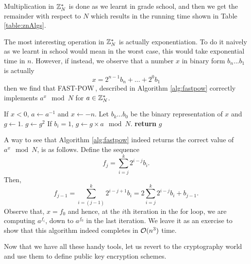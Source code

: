 

Multiplication in ${{\mathbb Z}}_N^*$ is done as we learnt in grade school, and then we get the remainder with respect to $N$ which results in the running time shown in Table \ref{table:znAlgs}. 

\newcommand{\fpow}{\textnormal{FAST-POW}\,}

The most interesting operation in ${{\mathbb Z}}_N^*$ is actually exponentiation. To do it naively as we learnt in school would mean in the worst case, this would take exponential time in $n$.  However, if instead, we observe that a number $x$ in binary form $b_n...b_1$ is actually 
\[
x = 2^{n-1}b_n + ...  + 2^0 b_1
\] 
then we find that \fpow, described in Algorithm \ref{alg:fastpow} correctly implements $a^x\mod N$ for $a\in {{\mathbb Z}}_N^*$.

\begin{algorithm}[H]
\begin{algorithmic}[1]
  \scriptsize
  \State If $x < 0$, $a\longleftarrow a^{-1}$ and $x \longleftarrow -n$.
  \State Let $b_{k}...b_0$ be the binary representation of $x$ and $g \longleftarrow 1$.
  	\State $g \longleftarrow g^2$
	\State If $b_i = 1$, $g \longleftarrow g\times a\mod N$.
  \EndFor
  \State \textbf{return} $g$
\end{algorithmic}
\caption{\fpow$(a, x)$}
\label{alg:fastpow}
\end{algorithm}

A way to see that Algorithm \ref{alg:fastpow} indeed returns the correct value of $a^x\mod N$, is as follows. Define the sequence 
\[
f_j = \sum_{i = j}^{k} 2^{i - j} b_i.
\]
Then, 
\[
f_{j-1} = \sum_{i = (j-1)}^{k} 2^{i - j + 1} b_i = 2\sum_{i = j}^{k} 2^{i - j} b_i + b_{j-1}.
\]
Observe that, $x = f_0$ and hence, at the $i$th iteration in the for loop, we are computing $a^{f_i}$, down to $a^{f_0}$ in the last iteration. We leave it as an exercise to show that this algorithm indeed completes in ${\cal O}(n^3)$ time.


Now that we have all these handy tools, let us revert to the cryptography world and use them to define public key encryption schemes.

